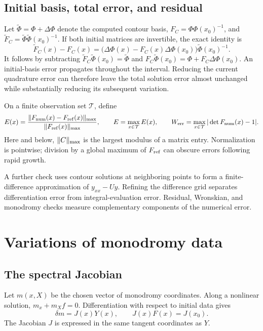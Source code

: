\subsection{Initial basis, total error, and residual}
Let $\widetilde\Phi=\Phi+\Delta\Phi$ denote the computed contour basis,
$F_C=\Phi\Phi(x_0)^{-1}$, and
$\widetilde F_C=\widetilde\Phi\widetilde\Phi(x_0)^{-1}$.
If both initial matrices are invertible, the exact identity is
\begin{equation}\label{eq:initial-error}
 \widetilde F_C(x)-F_C(x)=
 \bigl(\Delta\Phi(x)-F_C(x)\Delta\Phi(x_0)\bigr)
 \widetilde\Phi(x_0)^{-1}.
\end{equation}
It follows by subtracting
$\widetilde F_C\widetilde\Phi(x_0)=\widetilde\Phi$ and
$F_C\widetilde\Phi(x_0)=\Phi+F_C\Delta\Phi(x_0)$.
An initial-basis error propagates throughout the interval. Reducing the
current quadrature error can therefore leave the total solution error
almost unchanged while substantially reducing its subsequent variation.

On a finite observation set $\mathcal T$, define
\begin{equation}\label{eq:errors}
 E(x)=\frac{\lVert F_{\rm num}(x)-F_{\rm ref}(x)\rVert_{\max}}{\lVert F_{\rm ref}(x)\rVert_{\max}},
 \qquad E=\max_{x\in\mathcal T}E(x),\qquad
 W_{\rm err}=\max_{x\in\mathcal T}|\det F_{\rm num}(x)-1|.
\end{equation}
Here and below, $\lVert C\rVert_{\max}$ is the largest modulus of a matrix entry.
Normalization is pointwise; division by a global maximum of
$F_{\rm ref}$ can obscure errors following rapid growth.

A further check uses contour solutions at neighboring points to form a
finite-difference approximation of $y_{xx}-Uy$. Refining the difference
grid separates differentiation error from integral-evaluation error.
Residual, Wronskian, and monodromy checks measure complementary
components of the numerical error.

\section{Variations of monodromy data}\label{sec:monodromy}
\subsection{The spectral Jacobian}
Let $m(x,X)$ be the chosen vector of monodromy coordinates.
Along a nonlinear solution, $m_x+m_X f=0$. Differentiation with respect
to initial data gives
\begin{equation*}
 \delta m=J(x)Y(x),\qquad J(x)F(x)=J(x_0).
\end{equation*}
The Jacobian $J$ is expressed in the same tangent coordinates as $Y$.

